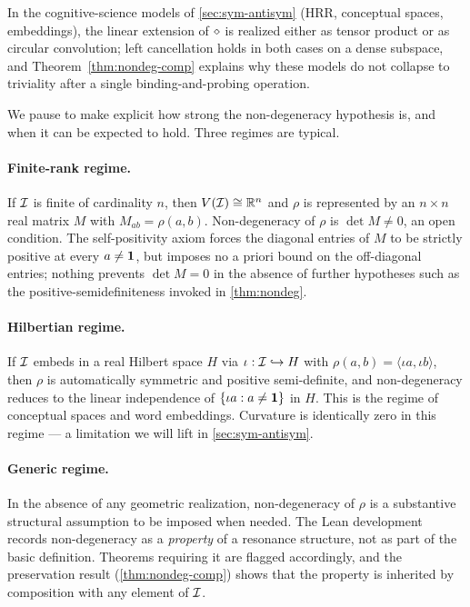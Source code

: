 \begin{remark}
In the cognitive-science models of \cref{sec:sym-antisym} (HRR, conceptual
spaces, embeddings), the linear extension of $\mathbin{\diamond}$ is realized either
as tensor product or as circular convolution; left cancellation holds in
both cases on a dense subspace, and Theorem~\ref{thm:nondeg-comp} explains
why these models do not collapse to triviality after a single
binding-and-probing operation.
\end{remark}

We pause to make explicit how strong the non-degeneracy hypothesis is, and
when it can be expected to hold. Three regimes are typical.

\paragraph{Finite-rank regime.} If $\mathcal{I}$ is finite of cardinality $n$,
then $V(\mathcal{I})\cong\mathbb{R}^n$ and $\rho$ is represented by an $n\times n$
real matrix $M$ with $M_{ab}=\rho(a,b)$. Non-degeneracy of $\rho$ is
$\det M\ne 0$, an open condition. The self-positivity axiom forces the
diagonal entries of $M$ to be strictly positive at every $a\ne\mathbf{1}$, but
imposes no a priori bound on the off-diagonal entries; nothing prevents
$\det M=0$ in the absence of further hypotheses such as the
positive-semidefiniteness invoked in \cref{thm:nondeg}.

\paragraph{Hilbertian regime.} If $\mathcal{I}$ embeds in a real Hilbert space
$H$ via $\iota:\mathcal{I}\hookrightarrow H$ with $\rho(a,b)=\langle\iota
a,\iota b\rangle$, then $\rho$ is automatically symmetric and positive
semi-definite, and non-degeneracy reduces to the linear independence of
$\{\iota a:a\ne\mathbf{1}\}$ in $H$. This is the regime of conceptual spaces
and word embeddings. Curvature is identically zero in this regime --- a
limitation we will lift in \cref{sec:sym-antisym}.

\paragraph{Generic regime.} In the absence of any geometric realization,
non-degeneracy of $\rho$ is a substantive structural assumption to be
imposed when needed. The Lean development records non-degeneracy as a
\emph{property} of a resonance structure, not as part of the basic
definition. Theorems requiring it are flagged accordingly, and the
preservation result (\cref{thm:nondeg-comp}) shows that the property is
inherited by composition with any element of $\mathcal{I}$.

